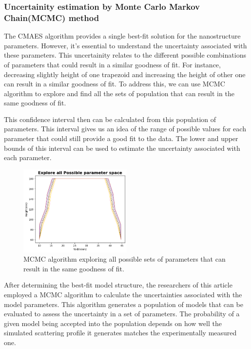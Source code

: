 \subsubsection{Uncertainity estimation by Monte Carlo Markov Chain(MCMC) method}
\label{sec:mcmc_cdsaxs}

The CMAES algorithm provides a single best-fit solution for the nanostructure parameters. However, it's essential to understand the uncertainty associated with these parameters.
This uncertainity relates to the different possible combinations of parameters that could result in a similar goodness of fit. 
For instance, decreasing slightly height of one trapezoid and increasing the height of other one can result in a similar goodness of fit.
To address this, we can use MCMC algorithm to explore and find all the sets of population that can result in the same goodness of fit.

\medskip

This confidence interval then can be calculated from this population of parameters. This interval gives us an idea of the range of possible values for each parameter that could still provide a good fit to the data.
The lower and upper bounds of this interval can be used to estimate the uncertainty associated with each parameter.

\begin{figure}[h]
    \centering
    \includegraphics[width=0.5\textwidth]{images/mcmc.png}
    \caption{MCMC algorithm exploring all possible sets of parameters that can result in the same goodness of fit.}
\end{figure}
\medskip

After determining the best-fit model structure, the researchers of this article \cite{sunday2016evaluation}
employed a MCMC algorithm to calculate the uncertainties associated with the model parameters.
This algorithm generates a population of models that can be evaluated to assess the uncertainty
in a set of parameters. The probability of a given model being accepted into the population
depends on how well the simulated scattering profile it generates matches the experimentally
measured one.

